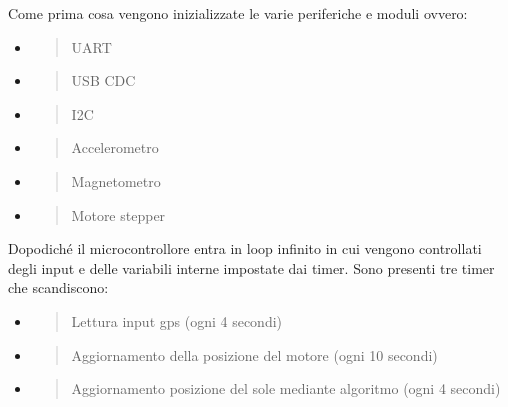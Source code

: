 Come prima cosa vengono inizializzate le varie periferiche e moduli
ovvero:

\begin{itemize}
\item
  \begin{quote}
  UART
  \end{quote}
\item
  \begin{quote}
  USB CDC
  \end{quote}
\item
  \begin{quote}
  I2C
  \end{quote}
\item
  \begin{quote}
  Accelerometro
  \end{quote}
\item
  \begin{quote}
  Magnetometro
  \end{quote}
\item
  \begin{quote}
  Motore stepper
  \end{quote}
\end{itemize}

Dopodiché il microcontrollore entra in loop infinito in cui vengono
controllati degli input e delle variabili interne impostate dai timer.
Sono presenti tre timer che scandiscono:

\begin{itemize}
\item
  \begin{quote}
  Lettura input gps (ogni 4 secondi)
  \end{quote}
\item
  \begin{quote}
  Aggiornamento della posizione del motore (ogni 10 secondi)
  \end{quote}
\item
  \begin{quote}
  Aggiornamento posizione del sole mediante algoritmo (ogni 4 secondi)
  \end{quote}
\end{itemize}

